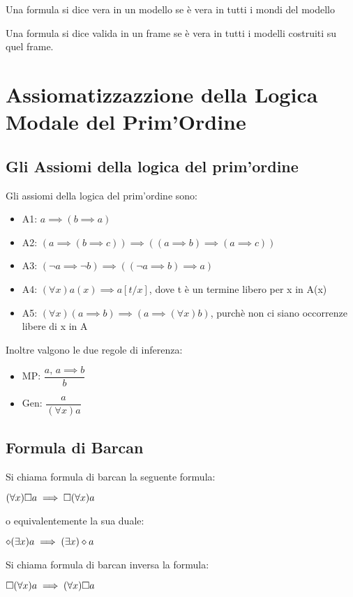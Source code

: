 Una formula si dice vera in un modello se è vera in tutti i mondi
del modello

Una formula si dice valida in un frame se è vera in tutti i modelli
costruiti su quel frame.


\section{Assiomatizzazzione della Logica Modale del Prim'Ordine}


\subsection{Gli Assiomi della logica del prim'ordine}

Gli assiomi della logica del prim'ordine sono:
\begin{itemize}
\item A1: $a\implies(b\implies a)$
\item A2: $(a\implies(b\implies c))\implies((a\implies b)\implies(a\implies c))$
\item A3: $(\neg a\implies\neg b)\implies((\neg a\implies b)\implies a)$
\item A4: $(\forall x)a(x)\implies a[t/x]$, dove t è un termine libero
per x in A(x)
\item A5: $(\forall x)(a\implies b)\implies(a\implies(\forall x)b)$, purchè
non ci siano occorrenze libere di x in A
\end{itemize}
Inoltre valgono le due regole di inferenza:
\begin{itemize}
\item MP: $\dfrac{a,\, a\implies b}{b}$
\item Gen: $\dfrac{a}{(\forall x)a}$
\end{itemize}

\subsection{Formula di Barcan}

Si chiama formula di barcan la seguente formula:

$(\forall x)\square a\implies\square(\forall x)a$

o equivalentemente la sua duale:

$\diamond(\exists x)a\implies(\exists x)\diamond a$

Si chiama formula di barcan inversa la formula:

$\square(\forall x)a\implies(\forall x)\square a$


